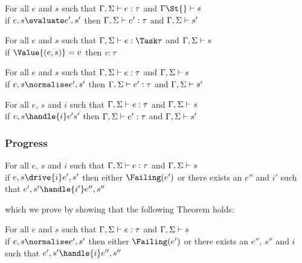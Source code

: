 \begin{theorem}
      For all $e$ and $s$ such that
      $\Gamma,\Sigma\vdash e:\tau$ and $\Gamma\St{}\infers s$\\
      if $e,s\evaluate e',s'$
      then $\Gamma,\Sigma\vdash e':\tau$ and $\Gamma,\Sigma\vdash s'$
      \label{thmpreseval}
\end{theorem}

\begin{lemma}
  For all $e$ and $s$ such that $\Gamma,\Sigma\infers e:\Task\tau$ and $\Gamma,\Sigma\vdash s$\\
  if $\Value{(e,s)}=v$ then $v:\tau$
  \label{lemmavaluepreserves}
\end{lemma}

\begin{theorem}
    For all $e$ and $s$ such that $\Gamma,\Sigma\vdash e:\tau$ and $\Gamma,\Sigma\vdash s$\\
    if   $e,s \normalise e',s'$ then $\Gamma,\Sigma\vdash e':\tau$ and $\Gamma,\Sigma\vdash s'$
    \label{thmpresnorm}
\end{theorem}

\begin{theorem}
  For all $e$, $s$ and $i$ such that $\Gamma,\Sigma\vdash e:\tau$ and $\Gamma,\Sigma\vdash s$\\
  if $ e,s \handle{i} e's'$ then $\Gamma,\Sigma\vdash e':\tau$ and $\Gamma,\Sigma\vdash s'$
   \label{thmpreshandle}
\end{theorem}

\subsubsection{Progress}

\begin{theorem}
 For all $e$, $s$ and $i$ such that $\Gamma,\Sigma\vdash e:\tau$ and $\Gamma,\Sigma\vdash s$\\
 if $e,s \drive{i} e',s'$ then either $\Failing(e')$ or there exists an $e''$ and $i'$ such that $e',s'\handle{i'}e'',s''$
\end{theorem}

which we prove by showing that the following Theorem holds:
\begin{theorem}
  For all $e$ and $s$ such that $\Gamma,\Sigma\vdash e:\tau$ and $\Gamma,\Sigma\vdash s$\\
  if $e,s \normalise e',s'$ then either $\Failing(e')$ or there exists an $e''$, $s''$ and $i$ such that $e',s'\handle{i}e'',s''$
  \label{thmprogressnorm}
\end{theorem}

